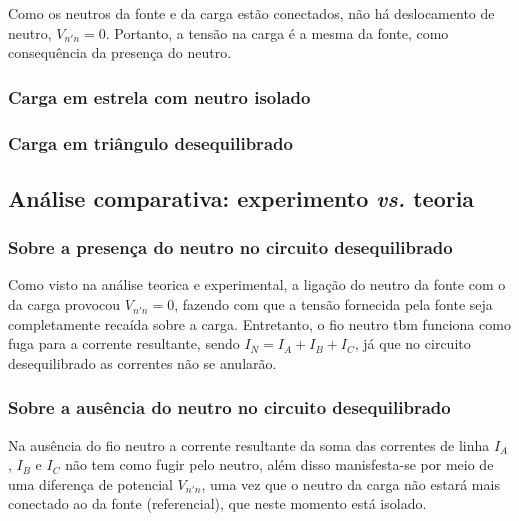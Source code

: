 \documentclass[a4paper,12pt,oneside,openany,table,xcdraw]{article}
\begin{document}
Como os neutros da fonte e da carga estão conectados, não há deslocamento de neutro, $V_{n'n}=0$. Portanto, a tensão na carga é a mesma da fonte, como consequência da presença do neutro.

\subsubsection{Carga em estrela com neutro isolado} \label{m2:teoria}

\subsubsection{Carga em triângulo desequilibrado} \label{m3:teoria}

\subsection{Análise comparativa: experimento \emph{vs.} teoria}
\subsubsection{Sobre a presença do neutro no circuito desequilibrado}
Como visto na análise teorica e experimental, a ligação do neutro da fonte com o da carga provocou $V_{n'n}=0$, fazendo com que a tensão fornecida pela fonte seja completamente recaída sobre a carga. Entretanto, o fio neutro tbm funciona como fuga para a corrente resultante, sendo $I_N=I_A+I_B+I_C$, já que no circuito desequilibrado as correntes não se anularão. 

\subsubsection{Sobre a ausência do neutro no circuito desequilibrado}
Na ausência do fio neutro a corrente resultante da soma das correntes de linha $I_A$, $I_B$ e $I_C$ não tem como fugir pelo neutro, além disso manisfesta-se por meio de uma diferença de potencial $V_{n'n}$, uma vez que o neutro da carga não estará mais conectado ao da fonte (referencial), que neste momento está isolado.
\end{document}
